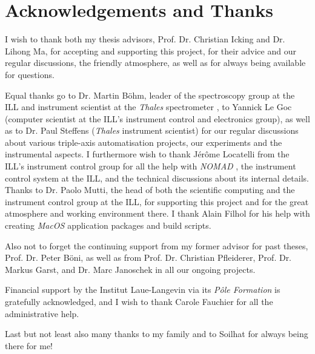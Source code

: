 %
%

\chapter*{Acknowledgements and Thanks}

I wish to thank both my thesis advisors, Prof. Dr. Christian Icking and Dr. Lihong Ma, for accepting
and supporting this project, for their advice and our regular discussions, the friendly atmosphere, 
as well as for always being available for questions.

Equal thanks go to Dr. Martin B\"ohm, leader of the spectroscopy group at the ILL and instrument
scientist at the \textit{Thales} spectrometer \cite{thales}, to Yannick Le Goc (computer scientist at the ILL's instrument
control and electronics group), as well as to Dr. Paul Steffens (\textit{Thales} instrument scientist) for our
regular discussions about various triple-axis automatisation projects, our experiments and the
instrumental aspects. I furthermore wish to thank Jérôme Locatelli from the ILL's instrument control group for
all the help with \textit{NOMAD} \cite{web_NOMAD}, the instrument control system at the ILL, and the technical discussions
about its internal details. 
Thanks to Dr. Paolo Mutti, the head of both the scientific computing and the instrument control group 
at the ILL, for supporting this project and for the great atmosphere and working environment there.
I thank Alain Filhol for his help with creating \textit{MacOS} application packages and build scripts.

Also not to forget the continuing support from my former advisor for past theses, Prof. Dr. Peter B\"oni,
as well as from Prof. Dr. Christian Pfleiderer, Prof. Dr. Markus Garst, and Dr. Marc Janoschek in all our ongoing projects.

Financial support by the Institut Laue-Langevin via its \textit{P\^ole Formation} is gratefully acknowledged,
and I wish to thank Carole Fauchier for all the administrative help.

Last but not least also many thanks to my family and to Soilhat for always being there for me!
